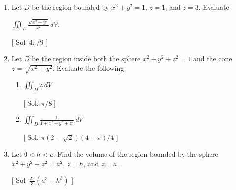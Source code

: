 \begin{enumerate}
\item  Let $D$ be the region bounded by $x^2 + y^2 = 1$, $z = 1$, and $z = 3$.  Evaluate 

$\displaystyle{ \iiint_D \frac{\sqrt{x^2 + y^2}}{z^2} \, dV }$.

[ Sol.  $4\pi/9$ ]  \\

\item  Let $D$ be the region inside both the sphere $x^2 + y^2 + z^2 = 1$ and the cone $z = \sqrt{x^2 + y^2}$.  Evaluate the following.
\begin{enumerate}
\item $\displaystyle{ \iiint_D z\, dV }$  

[ Sol.  $\pi/8$ ] \\

\item $\displaystyle{ \iiint_D \frac{1}{1 + x^2 + y^2 + z^2} \, dV }$

[ Sol.  $\pi (2-\sqrt{2}) (4 - \pi) / 4 $ ] \\
\end{enumerate}

\item  Let $0 < h < a$.  Find the volume of the region bounded by the sphere $x^2 + y^2 + z^2 = a^2$, $z = h$, and $z = a$.

[ Sol.  $\frac{2\pi}{3}(a^3 - h^3)$ ]  \\



\end{enumerate}